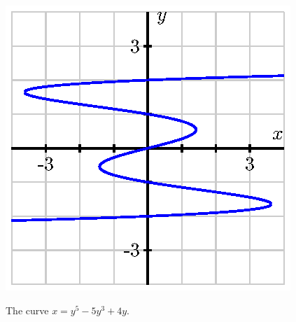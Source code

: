 \begin{marginfigure}[5cm]
\includegraphics{figures/2_7_Act1.eps}
\caption{The curve $x = y^5 - 5y^3 + 4y$.} \label{fig:2.7.Act1}
\end{marginfigure}

